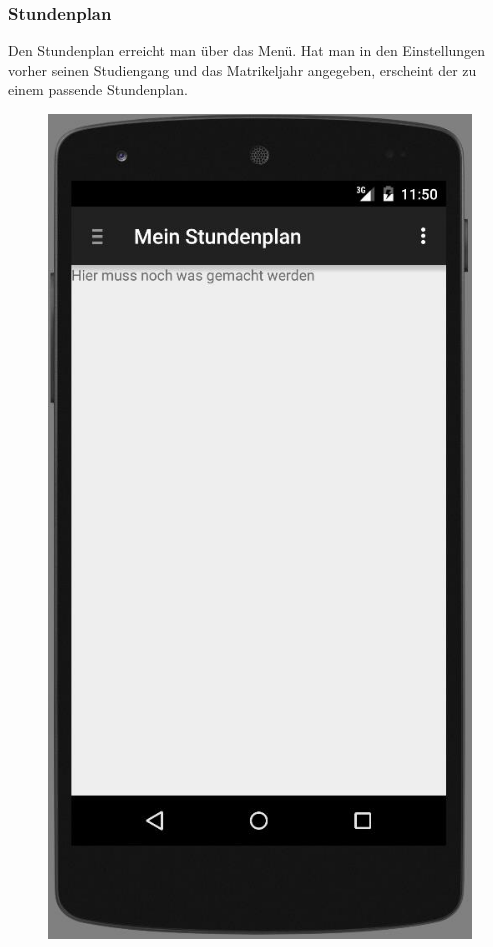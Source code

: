 \subsubsection{Stundenplan}

Den Stundenplan erreicht man über das Menü. Hat man in den Einstellungen vorher seinen Studiengang und das Matrikeljahr angegeben, erscheint der zu einem passende Stundenplan.

\begin{figure}[h]
	\centering
	\includegraphics[scale=0.6]{03_Bedienungsanleitung/img/stundenplan.jpg}
	\label{img:grafik-dummy}
\end{figure}

